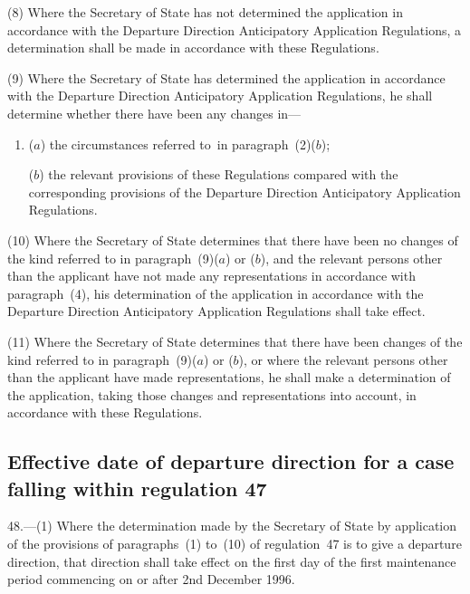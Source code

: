 \documentclass[12pt,a4paper]{article}
\begin{document}
(8) Where the Secretary of State has not determined the application in
accordance with the Departure Direction Anticipatory Application Regulations, a
determination shall be made in accordance with these Regulations.

(9) Where the Secretary of State has determined the application in accordance
with the Departure Direction Anticipatory Application Regulations, he shall
determine whether there have been any changes in—
\begin{enumerate}\item[]
($a$) the circumstances referred to~in paragraph~(2)($b$);

($b$) the relevant provisions of these Regulations compared with the corresponding
provisions of the Departure Direction Anticipatory Application Regulations.
\end{enumerate}

(10) Where the Secretary of State determines that there have been no changes of
the kind referred to in paragraph~(9)($a$) or ($b$), and the relevant persons other
than the applicant have not made any representations in accordance with
paragraph~(4), his determination of the application in accordance with the
Departure Direction Anticipatory Application Regulations shall take effect.

(11) Where the Secretary of State determines that there have been changes of the
kind referred to in paragraph~(9)($a$) or ($b$), or where the relevant persons other
than the applicant have made representations, he shall make a determination of
the application, taking those changes and representations into account, in
accordance with these Regulations.


\subsection[48. Effective date of departure direction for a case falling within regulation
47]{\sloppy Effective date of departure direction for a case falling within regulation
47}

48.—(1) Where the determination made by the Secretary of State by application
of the provisions of paragraphs~(1) to~(10) of regulation~47 is to give a
departure direction, that direction shall take effect on the first day of the
first maintenance period commencing on or after 2nd December 1996.
\end{document}
